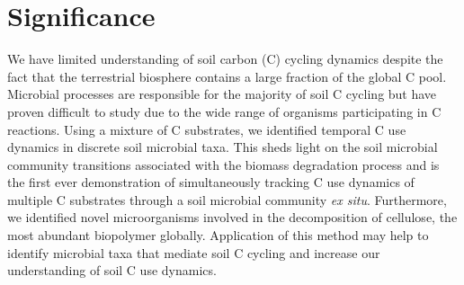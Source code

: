 \section{Significance} 
We have limited understanding of soil carbon (C) cycling dynamics despite the fact that the terrestrial biosphere contains a large fraction of the global C pool. Microbial processes are responsible for the majority of soil C cycling but have proven difficult to study due to the wide range of organisms participating in C reactions. Using a mixture of C substrates, we identified temporal C use dynamics in discrete soil microbial taxa. This sheds light on the soil microbial community transitions associated with the biomass degradation process and is the first ever demonstration of simultaneously tracking C use dynamics of multiple C substrates through a soil microbial community \textit{ex situ}. Furthermore, we identified novel microorganisms involved in the decomposition of cellulose, the most abundant biopolymer globally. Application of this method may help to identify microbial taxa that mediate soil C cycling and increase our understanding of soil C use dynamics. 